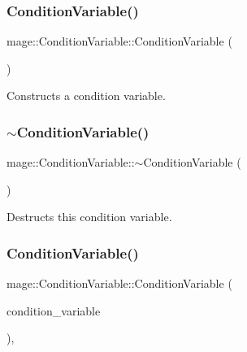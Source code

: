 \subsubsection{\texorpdfstring{Condition\+Variable()}{ConditionVariable()}\hspace{0.1cm}{\footnotesize\ttfamily [1/2]}}
{\footnotesize\ttfamily mage\+::\+Condition\+Variable\+::\+Condition\+Variable (\begin{DoxyParamCaption}{ }\end{DoxyParamCaption})}

Constructs a condition variable. \hypertarget{classmage_1_1_condition_variable_accd5253beb65b2904428afdb889cf00b}{}\label{classmage_1_1_condition_variable_accd5253beb65b2904428afdb889cf00b} 
\subsubsection{\texorpdfstring{$\sim$\+Condition\+Variable()}{~ConditionVariable()}}
{\footnotesize\ttfamily mage\+::\+Condition\+Variable\+::$\sim$\+Condition\+Variable (\begin{DoxyParamCaption}{ }\end{DoxyParamCaption})}

Destructs this condition variable. \hypertarget{classmage_1_1_condition_variable_add5ccf5807a94588c28621141df334d3}{}\label{classmage_1_1_condition_variable_add5ccf5807a94588c28621141df334d3} 
\subsubsection{\texorpdfstring{Condition\+Variable()}{ConditionVariable()}\hspace{0.1cm}{\footnotesize\ttfamily [2/2]}}
{\footnotesize\ttfamily mage\+::\+Condition\+Variable\+::\+Condition\+Variable (\begin{DoxyParamCaption}\item[{const \hyperlink{classmage_1_1_condition_variable}{Condition\+Variable} \&}]{condition\+\_\+variable }\end{DoxyParamCaption})\hspace{0.3cm}{\ttfamily [private]}, {\ttfamily [delete]}}

